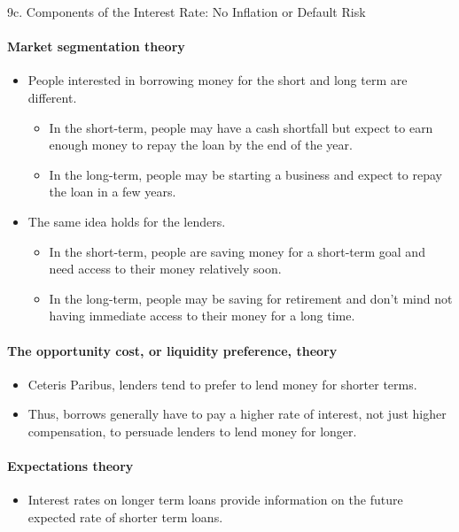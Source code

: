 \begin{CHPT_SUMM_AUTO}[label = {L.-9c}]{9c. Components of the Interest Rate: No Inflation or Default Risk}
\paragraph{Market segmentation theory}
\begin{itemize}[leftmargin = *]
	\item	People interested in borrowing money for the short and long term are different.
		\begin{itemize}[leftmargin = *]
		\item	In the short-term, people may have a cash shortfall but expect to earn enough money to repay the loan by the end of the year.
		\item	In the long-term, people may be starting a business and expect to repay the loan in a few years.
		\end{itemize}
	\item	The same idea holds for the lenders.
		\begin{itemize}[leftmargin = *]
		\item	In the short-term, people are saving money for a short-term goal and need access to their money relatively soon.
		\item	In the long-term, people may be saving for retirement and don't mind not having immediate access to their money for a long time.
		\end{itemize}
\end{itemize}

\paragraph{The opportunity cost, or liquidity preference, theory}
\begin{itemize}[leftmargin = *]
	\item	Ceteris Paribus, lenders tend to prefer to lend money for shorter terms.
	\item	Thus, borrows generally have to pay a higher rate of interest, not just higher compensation, to persuade lenders to lend money for longer.
\end{itemize}

\paragraph{Expectations theory}
\begin{itemize}[leftmargin = *]
	\item	Interest rates on longer term loans provide information on the future expected rate of shorter term loans.
\end{itemize}


\end{CHPT_SUMM_AUTO}
